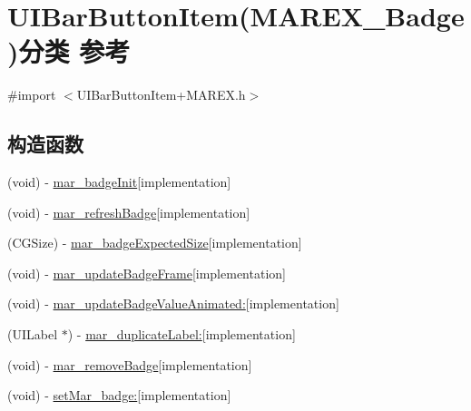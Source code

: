\hypertarget{category_u_i_bar_button_item_07_m_a_r_e_x___badge_08}{}\section{U\+I\+Bar\+Button\+Item(M\+A\+R\+E\+X\+\_\+\+Badge)分类 参考}
\label{category_u_i_bar_button_item_07_m_a_r_e_x___badge_08}


{\ttfamily \#import $<$U\+I\+Bar\+Button\+Item+\+M\+A\+R\+E\+X.\+h$>$}

\subsection*{构造函数}
\begin{DoxyCompactItemize}
\item 
(void) -\/ \hyperlink{category_u_i_bar_button_item_07_m_a_r_e_x___badge_08_aa4dd91f3022d73b975ca5bbfd84f2e09}{mar\+\_\+badge\+Init}{\ttfamily  \mbox{[}implementation\mbox{]}}
\item 
(void) -\/ \hyperlink{category_u_i_bar_button_item_07_m_a_r_e_x___badge_08_a3ed88718fc074681665c92aeea9a92a1}{mar\+\_\+refresh\+Badge}{\ttfamily  \mbox{[}implementation\mbox{]}}
\item 
(C\+G\+Size) -\/ \hyperlink{category_u_i_bar_button_item_07_m_a_r_e_x___badge_08_a8dbc50b27262aa8ad25afd04f910d9aa}{mar\+\_\+badge\+Expected\+Size}{\ttfamily  \mbox{[}implementation\mbox{]}}
\item 
(void) -\/ \hyperlink{category_u_i_bar_button_item_07_m_a_r_e_x___badge_08_a3a93e76a12d66d2de66b9747635f7509}{mar\+\_\+update\+Badge\+Frame}{\ttfamily  \mbox{[}implementation\mbox{]}}
\item 
(void) -\/ \hyperlink{category_u_i_bar_button_item_07_m_a_r_e_x___badge_08_a8e4f63b574d83ff31dd5b425cfbf00ed}{mar\+\_\+update\+Badge\+Value\+Animated\+:}{\ttfamily  \mbox{[}implementation\mbox{]}}
\item 
(U\+I\+Label $\ast$) -\/ \hyperlink{category_u_i_bar_button_item_07_m_a_r_e_x___badge_08_a988e768a61c0dbb1e1535d545f78357d}{mar\+\_\+duplicate\+Label\+:}{\ttfamily  \mbox{[}implementation\mbox{]}}
\item 
(void) -\/ \hyperlink{category_u_i_bar_button_item_07_m_a_r_e_x___badge_08_af52c0d57f158a228879c931d04fe935e}{mar\+\_\+remove\+Badge}{\ttfamily  \mbox{[}implementation\mbox{]}}
\item 
(void) -\/ \hyperlink{category_u_i_bar_button_item_07_m_a_r_e_x___badge_08_a8c28275fdf71034987e60402833a0bfd}{set\+Mar\+\_\+badge\+:}{\ttfamily  \mbox{[}implementation\mbox{]}}

\end{DoxyCompactItemize}
